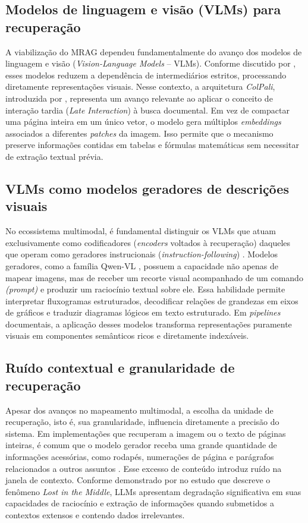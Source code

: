 \subsection{Modelos de linguagem e visão (VLMs) para recuperação}
\label{subsec:vlms_recuperacao}

A viabilização do MRAG dependeu fundamentalmente do avanço dos modelos de linguagem e visão (\textit{Vision-Language Models} -- VLMs). Conforme discutido por , esses modelos reduzem a dependência de intermediários estritos, processando diretamente representações visuais. Nesse contexto, a arquitetura \textit{ColPali}, introduzida por , representa um avanço relevante ao aplicar o conceito de interação tardia (\textit{Late Interaction}) à busca documental. Em vez de compactar uma página inteira em um único vetor, o modelo gera múltiplos \textit{embeddings} associados a diferentes \textit{patches} da imagem. Isso permite que o mecanismo preserve informações contidas em tabelas e fórmulas matemáticas sem necessitar de extração textual prévia.

\subsection{VLMs como modelos geradores de descrições visuais}
\label{subsec:vlms_geradores}

No ecossistema multimodal, é fundamental distinguir os VLMs que atuam exclusivamente como codificadores (\textit{encoders} voltados à recuperação) daqueles que operam como geradores instrucionais (\textit{instruction-following}) . Modelos geradores, como a família Qwen-VL , possuem a capacidade não apenas de mapear imagens, mas de receber um recorte visual acompanhado de um comando \textit{(prompt)} e produzir um raciocínio textual sobre ele. Essa habilidade permite interpretar fluxogramas estruturados, decodificar relações de grandezas em eixos de gráficos e traduzir diagramas lógicos em texto estruturado. Em \textit{pipelines} documentais, a aplicação desses modelos transforma representações puramente visuais em componentes semânticos ricos e diretamente indexáveis.

\subsection{Ruído contextual e granularidade de recuperação}
\label{subsec:ruido_contextual}

Apesar dos avanços no mapeamento multimodal, a escolha da unidade de recuperação, isto é, sua granularidade, influencia diretamente a precisão do sistema. Em implementações que recuperam a imagem ou o texto de páginas inteiras, é comum que o modelo gerador receba uma grande quantidade de informações acessórias, como rodapés, numerações de página e parágrafos relacionados a outros assuntos . Esse excesso de conteúdo introduz ruído na janela de contexto. Conforme demonstrado por  no estudo que descreve o fenômeno \textit{Lost in the Middle}, LLMs apresentam degradação significativa em suas capacidades de raciocínio e extração de informações quando submetidos a contextos extensos e contendo dados irrelevantes.

